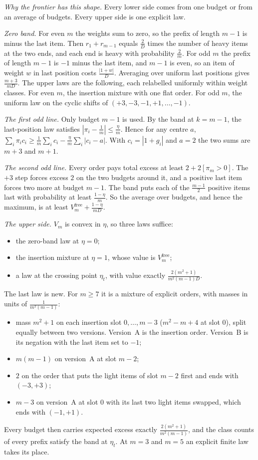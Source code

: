 \emph{Why the frontier has this shape.} Every lower side comes from one budget or from an
average of budgets. Every upper side is one explicit law.

\emph{Zero band.} For even $m$ the weights sum to zero, so the prefix of length $m-1$ is minus
the last item. Then $r_{1}+r_{m-1}$ equals $\frac{2}{D}$ times the number of heavy items at
the two ends, and each end is heavy with probability $\frac{2}{m}$. For odd $m$ the prefix
of length $m-1$ is $-1$ minus the last item, and $m-1$ is even, so an item of weight $w$ in
last position costs $\frac{|1+w|}{D}$. Averaging over uniform last positions gives
$\frac{m+3}{mD}$. The upper laws are the following, each relabelled uniformly within weight
classes. For even $m$, the insertion mixture with one flat order. For odd $m$, the uniform
law on the cyclic shifts of $(+3,-3,-1,+1,\dots,-1)$.

\emph{The first odd line.} Only budget $m-1$ is used. By the band at $k=m-1$, the
last-position law satisfies $|\pi_{i}-\frac1m|\le\frac{\eta}{m}$. Hence for any centre $a$,
$\sum_{i}\pi_{i}c_{i}\ge\frac1m\sum_{i}c_{i}-\frac{\eta}{m}\sum_{i}|c_{i}-a|$. With
$c_{i}=|1+g_{i}|$ and $a=2$ the two sums are $m+3$ and $m+1$.

\emph{The second odd line.} Every order pays total excess at least $2+2[\pi_{m}>0]$. The
$+3$ step forces excess $2$ on the two budgets around it, and a positive last item forces two
more at budget $m-1$. The band puts each of the $\frac{m-1}{2}$ positive items last with
probability at least $\frac{1-\eta}{m}$. So the average over budgets, and hence the maximum,
is at least $V^{\mathrm{free}}_{m}+\frac{1-\eta}{mD}$.

\emph{The upper side.} $V_{m}$ is convex in $\eta$, so three laws suffice:
\begin{itemize}
\item the zero-band law at $\eta=0$;
\item the insertion mixture at $\eta=1$, whose value is $V^{\mathrm{free}}_{m}$;
\item a law at the crossing point $\eta_{t}$, with value exactly
$\frac{2(m^{2}+1)}{m^{2}(m-1)D}$.
\end{itemize}
The last law is new. For $m\ge7$ it is a mixture of explicit orders, with masses in units of
$\frac{1}{m^{2}(m-1)}$:
\begin{itemize}
\item mass $m^{2}+1$ on each insertion slot $0,\dots,m-3$ ($m^{2}-m+4$ at slot $0$), split
equally between two versions. Version~A is the insertion order. Version~B is its negation
with the last item set to $-1$;
\item $m(m-1)$ on version~A at slot $m-2$;
\item $2$ on the order that puts the light items of slot $m-2$ first and ends with
$(-3,+3)$;
\item $m-3$ on version~A at slot $0$ with its last two light items swapped, which ends with
$(-1,+1)$.
\end{itemize}
Every budget then carries expected excess exactly $\frac{2(m^{2}+1)}{m^{2}(m-1)}$, and the
class counts of every prefix satisfy the band at $\eta_{t}$. At $m=3$ and $m=5$ an explicit
finite law takes its place.

